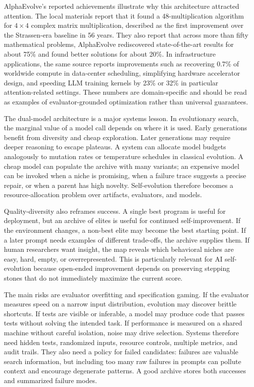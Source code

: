 AlphaEvolve's reported achievements illustrate why this architecture attracted attention.  The local materials report that it found a 48-multiplication algorithm for $4\times4$ complex matrix multiplication, described as the first improvement over the Strassen-era baseline in 56 years.  They also report that across more than fifty mathematical problems, AlphaEvolve rediscovered state-of-the-art results for about 75\% and found better solutions for about 20\%.  In infrastructure applications, the same source reports improvements such as recovering 0.7\% of worldwide compute in data-center scheduling, simplifying hardware accelerator design, and speeding LLM training kernels by 23\% or 32\% in particular attention-related settings.  These numbers are domain-specific and should be read as examples of evaluator-grounded optimization rather than universal guarantees.

The dual-model architecture is a major systems lesson.  In evolutionary search, the marginal value of a model call depends on where it is used.  Early generations benefit from diversity and cheap exploration.  Later generations may require deeper reasoning to escape plateaus.  A system can allocate model budgets analogously to mutation rates or temperature schedules in classical evolution.  A cheap model can populate the archive with many variants; an expensive model can be invoked when a niche is promising, when a failure trace suggests a precise repair, or when a parent has high novelty.  Self-evolution therefore becomes a resource-allocation problem over artifacts, evaluators, and models.

Quality-diversity also reframes success.  A single best program is useful for deployment, but an archive of elites is useful for continued self-improvement.  If the environment changes, a non-best elite may become the best starting point.  If a later prompt needs examples of different trade-offs, the archive supplies them.  If human researchers want insight, the map reveals which behavioral niches are easy, hard, empty, or overrepresented.  This is particularly relevant for AI self-evolution because open-ended improvement depends on preserving stepping stones that do not immediately maximize the current score.

The main risks are evaluator overfitting and specification gaming.  If the evaluator measures speed on a narrow input distribution, evolution may discover brittle shortcuts.  If tests are visible or inferable, a model may produce code that passes tests without solving the intended task.  If performance is measured on a shared machine without careful isolation, noise may drive selection.  Systems therefore need hidden tests, randomized inputs, resource controls, multiple metrics, and audit trails.  They also need a policy for failed candidates: failures are valuable search information, but including too many raw failures in prompts can pollute context and encourage degenerate patterns.  A good archive stores both successes and summarized failure modes.


